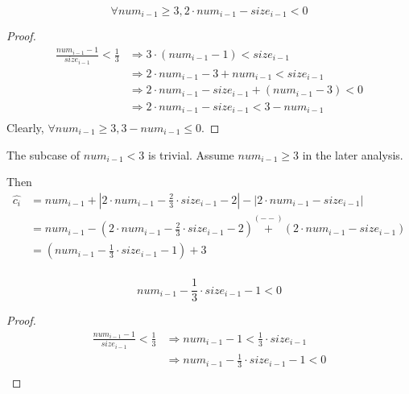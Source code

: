 \begin{lemma}
    \begin{equation*}
        \forall num_{i-1} \geq 3, 
        2 \cdot num_{i-1} - size_{i-1} < 0
    \end{equation*}
\end{lemma}

\begin{proof}
    \begin{equation*}
    \begin{split}
        \frac{num_{i-1}-1}{size_{i-1}} < \frac{1}{3}
        & \Longrightarrow 3 \cdot (num_{i-1} - 1) < size_{i-1} \\
        & \Longrightarrow 2 \cdot num_{i-1} - 3 + num_{i-1} < size_{i-1} \\
        & \Longrightarrow 2 \cdot num_{i-1} - size_{i-1} + (num_{i-1} - 3) < 0 \\
        & \Longrightarrow 2 \cdot num_{i-1} - size_{i-1} < 3 - num_{i-1} \\
    \end{split}
    \end{equation*}
    Clearly, $\forall num_{i-1} \geq 3, 3 - num_{i-1} \leq 0$.
\end{proof}

The subcase of $num_{i-1} < 3$ is trivial.
Assume $num_{i-1} \geq 3$ in the later analysis.

Then
\begin{equation*}
\begin{split}
    \hat{c_i} & = num_{i-1} + | 2 \cdot num_{i-1} - \frac{2}{3} \cdot size_{i-1} - 2 | 
        - | 2 \cdot num_{i-1} - size_{i-1} | \\
    & = num_{i-1} - ( 2 \cdot num_{i-1} - \frac{2}{3} \cdot size_{i-1} - 2 ) 
        \overset{(--)}{+} ( 2 \cdot num_{i-1} - size_{i-1} ) \\
    & = (num_{i-1} - \frac{1}{3} \cdot size_{i-1} - 1) + 3 \\
\end{split}
\end{equation*}

\begin{lemma}
    \begin{equation*}
        num_{i-1} - \frac{1}{3} \cdot size_{i-1} - 1 < 0
    \end{equation*}
\end{lemma}

\begin{proof}
    \begin{equation*}
    \begin{split}
        \frac{num_{i-1}-1}{size_{i-1}} < \frac{1}{3}
        & \Longrightarrow num_{i-1} - 1 < \frac{1}{3} \cdot size_{i-1} \\
        & \Longrightarrow num_{i-1} - \frac{1}{3} \cdot size_{i-1} - 1 < 0 \\
    \end{split}
    \end{equation*}
\end{proof}

